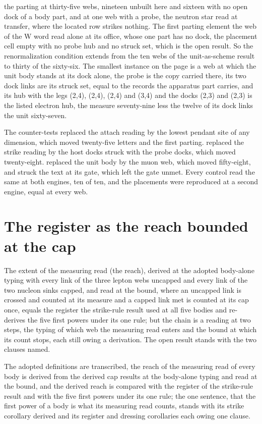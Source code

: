 \begin{chproof}
the parting at thirty-five webs, nineteen unbuilt here and sixteen with no open dock of a body part, and at one web with a probe, the neutron star read at transfer, where the located row strikes nothing. The first parting element the web of the W word read alone at its office, whose one part has no dock, the placement cell empty with no probe hub and no struck set, which is the open result. So the renormalization condition extends from the ten webs of the unit-as-scheme result to thirty of the sixty-six. The smallest instance on the page is a web at which the unit body stands at its dock alone, the probe is the copy carried there, its two dock links are its struck set, equal to the records the apparatus part carries, and its hub with the legs (2,4), (2,4), (2,4) and (3,4) and the docks (2,3) and (2,3) is the listed electron hub, the measure seventy-nine less the twelve of its dock links the unit sixty-seven.

The counter-tests replaced the attach reading by the lowest pendant site of any dimension, which moved twenty-five letters and the first parting. replaced the strike reading by the host docks struck with the probe docks, which moved twenty-eight. replaced the unit body by the muon web, which moved fifty-eight, and struck the text at its gate, which left the gate unmet. Every control read the same at both engines, ten of ten, and the placements were reproduced at a second engine, equal at every web.
\end{chproof}
\section{The register as the reach bounded at the cap}\label{mod:I-6-D536293-w-rbac}
\begin{chwall}\label{box:I-6-D536293-w-rbac:1}
The extent of the measuring read (the reach), derived at the adopted body-alone typing with every link of the three lepton webs uncapped and every link of the two nucleon sinks capped, and read at the bound, where an uncapped link is crossed and counted at its measure and a capped link met is counted at its cap once, equals the register the strike-rule result used at all five bodies and re-derives the five first powers under its one rule; but the chain is a reading at two steps, the typing of which web the measuring read enters and the bound at which its count stops, each still owing a derivation. The open result stands with the two clauses named.
\end{chwall}
The adopted definitions are transcribed, the reach of the measuring read of every body is derived from the derived cap results at the body-alone typing and read at the bound, and the derived reach is compared with the register of the strike-rule result and with the five first powers under its one rule; the one sentence, that the first power of a body is what its measuring read counts, stands with its strike corollary derived and its register and dressing corollaries each owing one clause.

